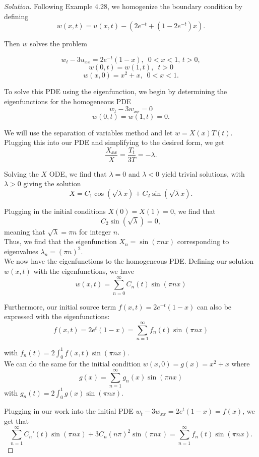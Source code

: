 \documentclass[11pt]{article}
\newenvironment{solution}
  {\renewcommand\qedsymbol{$\blacksquare$}\begin{proof}[Solution]}
  {\end{proof}}
\begin{document}
\begin{solution}
Following Example 4.28, we homogenize the boundary condition by defining \[ w(x, t) = u(x, t) - \left( 2e^{-t} + \left(1-2e^{-t}\right)x\right).\]

Then $w$ solves the problem 

\[ w_t - 3u_{xx} = 2e^{-t}(1-x), \, \, \, 0 < x < 1, \, t > 0,\]
\[ w(0, t) = w(1, t), \, \, \, t > 0\]
\[ w(x, 0) = x^2+x, \, \, \, 0 < x < 1.\]

To solve this PDE using the eigenfunction, we begin by determining the eigenfunctions for the homogeneous PDE
\[ w_t - 3w_{xx} = 0\]
\[ w(0, t) = w(1, t) = 0.\]

We will use the separation of variables method and let $w = X(x)T(t)$. Plugging this into our PDE and simplifying to the desired form, we get
\[ \frac{X_{xx}}{X} = \frac{T_t}{3T} = -\lambda.\]

Solving the $X$ ODE, we find that $\lambda = 0$ and $\lambda < 0$ yield trivial solutions, with $\lambda > 0$ giving the solution 
\[ X = C_1\cos(\sqrt{\lambda} x) + C_2 \sin(\sqrt{\lambda}x).\]

Plugging in the initial conditions $X(0) = X(1) = 0$, we find that 
\[C_2 \sin(\sqrt{\lambda}) = 0,\] meaning that $\sqrt{\lambda} = \pi n$ for integer $n$. \\

Thus, we find that the eigenfunction $X_n = \sin(\pi n x)$ corresponding to eigenvalues $\lambda_n = (\pi n)^2.$ \\

We now have the eigenfunctions to the homogeneous PDE. Defining our solution $w(x, t)$ with the eigenfunctions, we have \[ w(x, t) = \sum\limits_{n=0}^{\infty} C_n(t) \sin(\pi n x)\]

Furthermore, our initial source term $f(x, t) = 2e^{-t}(1-x)$ can also be expressed with the eigenfunctions:
\[ f(x, t) =2e^t(1-x) =\sum\limits_{n=1}^\infty f_n(t)\sin(\pi n x)\]

with $f_n(t) = 2\int_0^1 f(x, t) \sin(\pi n x).$ \\

We can do the same for the initial condition $w(x, 0) = g(x) = x^2 + x$ where 
\[ g(x) = \sum\limits_{n=1}^\infty g_n(x)\sin(\pi n x)\]
with $g_n(t) = 2\int_0^1 g(x) \sin(\pi n x).$

Plugging in our work into the initial PDE $w_t - 3w_{xx} = 2e^{t}(1-x) = f(x)$, we get that
\[ \sum\limits_{n=1}^{\infty} C_n'(t) \sin(\pi n x) + 3C_n(n\pi)^2 \sin(\pi n x) = \sum\limits_{n=1}^{\infty} f_n(t)\sin(\pi n x).\]


\end{solution}
\end{document}
